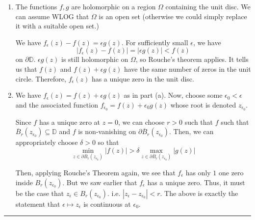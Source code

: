 \documentclass{article}
\begin{document}
\begin{enumerate}[label=(\alph*)]
  \item The functions $f, g$ are holomorphic on a region $\Omega$ containing the unit disc. We can assume WLOG that $\Omega$ is an open set (otherwise we could simply replace it with a suitable open set.) 
  
  \vskip 0.5cm
  We have $f_{\epsilon}(z) - f(z) = \epsilon g(z)$. For sufficiently small $\epsilon$, we have
  \[ \left| f_{\epsilon}(z) - f(z) \right| = |\epsilon g(z)| < f(z) \] on $\partial \mathbb{D}$. $\epsilon g(z)$ is still holomorphic on $\Omega$, so Rouche's theorem applies. It tells us that $f(z)$ and $f(z) + \epsilon g(z)$ have the same number of zeros in the unit circle. Therefore, $f_{\epsilon}(z)$ has a unique zero in the unit disc.

  \vskip 0.5cm
  
  \item We have $f_{\epsilon}(z) = f(z) + \epsilon g(z)$ as in part (a). Now, choose some $\epsilon_0 < \epsilon$ and the associated function $f_{{\epsilon_0}} = f(z) + \epsilon_0 g(z)$ whose root is denoted $z_{{\epsilon_0}}$. 
  
  \vskip 0.25cm
  Since $f$ has a unique zero at $z = 0$, we can choose $r > 0$ such that $f$ such that $\overline{B}_r(z_{{\epsilon_0}}) \subseteq \mathbb{D}$ and $f$ is non-vanishing on $\partial \overline{B}_r(z_{{\epsilon_0}})$. Then, we can appropriately choose $\delta > 0$ so that 
  \[  \min_{z \in \partial \overline{B}_r(z_{{\epsilon_0}})} |f(z)| > \delta \max_{z \in \partial \overline{B}_r(z_{{\epsilon_0}})} |g(z)|  \] 
  
  Then, applying Rouche's Theorem again, we see that $f_{\epsilon}$ has only $1$ one zero inside $B_r(z_{{\epsilon_0}})$. But we saw earlier that $f_{\epsilon}$ has a unique zero. Thus, it must be the case that $z_{\epsilon} \in {B}_r(z_{{\epsilon_0}})$. i.e. $|z_{\epsilon} - z_{{\epsilon_0}} | < r$. The above is exactly the statement that $\epsilon \mapsto z_{\epsilon}$ is continuous at $\epsilon_0$.
\end{enumerate}

\vskip 0.5cm
\hrule 
\vskip 0.5cm
\end{document}
